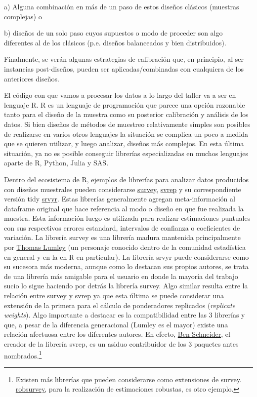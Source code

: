 \documentclass[
  spanish,
  a4paper,
]{scrreprt}
\begin{document}
a) Alguna combinación en más de un paso de estos diseños clásicos
(muestras complejas) o

b) diseños de un solo paso cuyos supuestos o modo de proceder son algo
diferentes al de los clásicos (p.e. diseños balanceados y bien
distribuidos).

Finalmente, se verán algunas estrategias de calibración que, en
principio, al ser instancias post-diseños, pueden ser
aplicadas/combinadas con cualquiera de los anteriores diseños.

El código con que vamos a procesar los datos a lo largo del taller va a
ser en lenguaje R. R es un lenguaje de programación que parece una
opción razonable tanto para el diseño de la muestra como su posterior
calibración y análisis de los datos. Si bien diseños de métodos de
muestreo relativamente simples son posibles de realizarse en varios
otros lenguajes la situación se complica un poco a medida que se quieren
utilizar, y luego analizar, diseños más complejos. En esta última
situación, ya no es posible conseguir librerías especializadas en muchos
lenguajes aparte de R, Python, Julia y SAS.

Dentro del ecosistema de R, ejemplos de librerías para analizar datos
producidos con diseños muestrales pueden considerarse
\href{https://r-survey.r-forge.r-project.org/survey/}{survey},
\href{https://bschneidr.github.io/svrep/}{svrep} y su correspondiente
versión tidy \href{http://gdfe.co/srvyr/}{srvyr}. Estas librerías
generalmente agregan meta-información al dataframe original que hace
referencia al modo o diseño en que fue realizada la muestra. Esta
información luego es utilizada para realizar estimaciones puntuales con
sus respectivos errores estandard, intervalos de confianza o
coeficientes de variación. La librería survey es una librería madura
mantenida principalmente por
\href{https://en.wikipedia.org/wiki/Thomas_Lumley_(statistician)}{Thomas
Lumley} (un personaje conocido dentro de la comunidad estadística en
general y en la en R en particular). La librería srvyr puede
considerarse como su sucesora más moderna, aunque como lo destacan sus
propios autores, se trata de una librería más amigable para el usuario
en donde la mayoría del trabajo sucio lo sigue haciendo por detrás la
librería survey. Algo similar resulta entre la relación entre survey y
svrep ya que esta última se puede considerar una extensión de la primera
para el cálculo de ponderadores replicados (\emph{replicate weights}).
Algo importante a destacar es la compatibilidad entre las 3 librerías y
que, a pesar de la diferencia generacional (Lumley es el mayor) existe
una relación afectuosa entre los diferentes autores. En efecto,
\href{https://github.com/bschneidr}{Ben Schneider}, el creador de la
librería svrep, es un asiduo contribuidor de los 3 paquetes antes
nombrados.\footnote{Existen más librerías que pueden considerarse como
  extensiones de survey.
  \href{https://cran.r-project.org/web/packages/robsurvey/index.html}{robsurvey},
  para la realización de estimaciones robustas, es otro ejemplo.}
\end{document}
